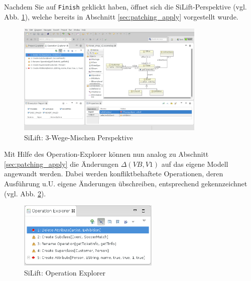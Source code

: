 Nachdem Sie auf \texttt{Finish} geklickt haben, öffnet sich die SiLift-Perspektive (vgl. Abb. \ref{silift-tutorial_merging_perspective}), welche bereits in Abschnitt \ref{sec:patching_apply} vorgestellt wurde.

\begin{figure}[H]
\centering
\includegraphics[width=0.8\textwidth]{merging/graphics/silift-tutorial_merging_perspective.png}
\caption{SiLift: 3-Wege-Mischen Perspektive}
\label{silift-tutorial_merging_perspective}
\end{figure}

Mit Hilfe des Operation-Explorer können nun analog zu Abschnitt \ref{sec:patching_apply} die Änderungen $\Delta(VB,V1)$ auf das eigene Modell angewandt werden.
Dabei werden konfliktbehaftete Operationen, deren Ausführung u.U. eigene Änderungen übschreiben, entsprechend ge\-kenn\-zeich\-net (vgl. Abb. \ref{silift-tutorial_merging_operation_explorer}).


\begin{figure}[H]
\centering
\includegraphics[width=0.6\textwidth]{merging/graphics/silift-tutorial_merging_operation_explorer.png}
\caption{SiLift: Operation Explorer}
\label{silift-tutorial_merging_operation_explorer}
\end{figure}

